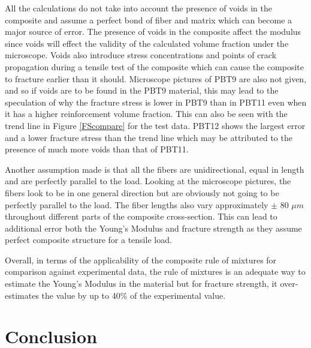 \documentclass[11pt]{article}
\begin{document}
All the calculations do not take into account the presence of voids in the composite and assume a perfect bond of fiber and matrix which can become a major source of error. The presence of voids in the composite affect the modulus since voids will effect the validity of the calculated volume fraction under the microscope. Voids also introduce stress concentrations and points of crack propagation during a tensile test of the composite which can cause the composite to fracture earlier than it should. Microscope pictures of PBT9 are also not given, and so if voids are to be found in the PBT9 material, this may lead to the speculation of why the fracture stress is lower in PBT9 than in PBT11 even when it has a higher reinforcement volume fraction. This can also be seen with the trend line in Figure \ref{FScompare} for the test data. PBT12 shows the largest error and a lower fracture stress than the trend line which may be attributed to the presence of much more voids than that of PBT11. 

Another assumption made is that all the fibers are unidirectional, equal in length and are perfectly parallel to the load. Looking at the microscope pictures, the fibers look to be in one general direction but are obviously not going to be perfectly parallel to the load. The fiber lengths also vary approximately $\pm$ 80 $\mu m$ throughout different parts of the composite cross-section. This can lead to additional error both the Young's Modulus and fracture strength as they assume perfect composite structure for a tensile load.
\singlespacing

Overall, in terms of the applicability of the composite rule of mixtures for comparison against experimental data, the rule of mixtures is an adequate way to estimate the Young's Modulus in the material but for fracture strength, it over-estimates the value by up to 40\% of the experimental value.

\section{Conclusion}
\end{document}
